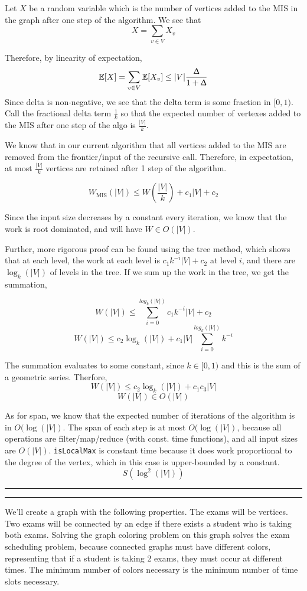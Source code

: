 \documentclass[11pt,letterpaper]{article}
\newcommand{\question}[2] {\vspace{.25in} \hrule\vspace{0.5em}
\noindent{\bf #1: #2} \vspace{0.5em}
\hrule \vspace{.10in}}
\begin{document}
Let $X$ be a random variable which is
the number of vertices added to the MIS in the graph after
one step of the algorithm. We see that $$X = \sum_{v \in V} X_v$$

Therefore, by linearity of expectation, $$\mathbb{E}[X] = \sum_{v \in V} \mathbb{E}[X_v] \leq |V| \frac{\Updelta}{1 + \Updelta}$$
Since delta is non-negative, we see that the delta term is some fraction in $[0,1)$.
Call the fractional delta term $\frac{1}{k}$ so that the expected number of vertexes
added to the MIS after one step of the algo is $\frac{|V|}{k}$. 

We know that in our current algorithm that all vertices added to the MIS are removed
from the frontier/input of the recursive call. Therefore, in expectation, at most $\frac{|V|}{k}$
vertices are retained after 1 step of the algorithm.

$$W_{\text{MIS}}(|V|) \leq W(\frac{|V|}{k}) + c_1|V| + c_2$$

Since the input size decreases by a constant every iteration, we know that the work is root dominated, and will
have $W \in O(|V|)$.

Further, more rigorous proof can be found using the tree method,
which shows that at each level, the work at each level is $c_1k^{-i}|V|+c_2$ at level $i$,
and there are $ \log_{k}(|V|)$ of levels in the tree. If we sum up the work in the tree,
we get the summation,

$$W(|V|) \leq \sum_{i=0}^{log_k(|V|)} c_1k^{-i}|V|+c_2$$
$$W(|V|) \leq c_2\log_k(|V|) + c_1|V|\sum_{i=0}^{log_k(|V|)} k^{-i}$$

The summation evaluates to some constant, since $k \in [0,1)$ and
this is the sum of a geometric series. Therfore,
$$W(|V|) \leq c_2\log_k(|V|) + c_1c_3|V|$$
$$W(|V|) \in O(|V|)$$

As for span, we know that the expected number of iterations of the algorithm
is in $O(\log(|V|)$. The span of each step is at most $O(\log(|V|)$, because
all operations are filter/map/reduce (with const. time functions),
and all input sizes are $O(|V|)$. \texttt{isLocalMax} is constant time
because it does work proportional to the degree of the vertex, which
in this case is upper-bounded by a constant.
$$S(\log^2(|V|))$$



\question{4}{Task 4.1}
We'll create a graph with the following properties.
The exams will be vertices. Two exams will be connected by an edge
if there exists a student who is taking both exams. Solving the
graph coloring problem on this graph solves the exam scheduling problem,
because connected graphs must have different colors, representing
that if a student is taking 2 exams, they must occur at different times.
The minimum number of colors necessary is the minimum number of time slots
necessary.
\end{document}
